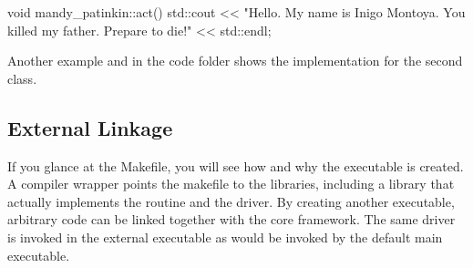\begin{CppCode}
void
mandy_patinkin::act()
{
    std::cout << "Hello. My name is Inigo Montoya. You killed my father. Prepare to die!"
              << std::endl;
}
\end{CppCode}

Another example  and  in the code folder shows the implementation for the second class.

\subsection{External Linkage}\label{subsec:linkage}
If you glance at the Makefile, you will see how and why the executable is created.
A compiler wrapper  points the makefile to the \sstmacro libraries, including a library  that actually implements the  routine and the \sstmacro driver.
By creating another executable, arbitrary code can be linked together with the core \sstmacro framework.
The same \sstmacro driver is invoked in the external executable as would be invoked by the default main executable.

